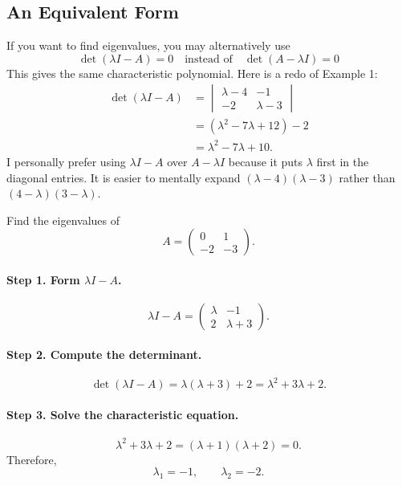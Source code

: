 \documentclass[10pt,letterpaper]{article}
\begin{document}
\subsection{An Equivalent Form}

If you want to find eigenvalues, you may alternatively use
\[
\boxed{\det(\lambda I-A)=0} \quad  \text{instead of} \quad \det(A-\lambda I)=0
\]
This gives the same characteristic polynomial. Here is a redo of Example 1:
\begin{align*}
\det(\lambda I-A)
&=
\begin{vmatrix}
\lambda-4&-1\\
-2&\lambda-3
\end{vmatrix}\\
&=(\lambda^2-7\lambda+12)-2\\
&=\lambda^2-7\lambda+10.
\end{align*}
I personally prefer using $\lambda I-A$ over $A-\lambda I$ because it puts $\lambda$ first
in the diagonal entries. It is easier to mentally expand $(\lambda-4)(\lambda-3)$ rather than $(4-\lambda)(3-\lambda)$.

\begin{example}[2]{
Find the eigenvalues of
\[
A=
\begin{pmatrix}
0&1\\
-2&-3
\end{pmatrix}.
\]
}

\paragraph{Step 1. Form $\lambda I-A$.}
\[
\lambda I-A=
\begin{pmatrix}
\lambda&-1\\
2&\lambda+3
\end{pmatrix}.
\]

\paragraph{Step 2. Compute the determinant.}
\[
\det(\lambda I-A)
=\lambda(\lambda+3)+2
=\lambda^2+3\lambda+2.
\]

\paragraph{Step 3. Solve the characteristic equation.}
\[
\lambda^2+3\lambda+2
=(\lambda+1)(\lambda+2)=0.
\]
Therefore,
\[
\boxed{\lambda_1=-1,\qquad \lambda_2=-2.}
\]
\end{example}
\end{document}
